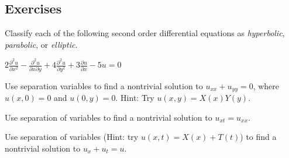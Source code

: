 \subsection{Exercises}

\begin{exercise}
Classify each of the following second order differential equations as \emph{hyperbolic}, \emph{parabolic}, or \emph{elliptic}.
\begin{tasks}
\task $\displaystyle 2 \frac{\partial^2 u}{\partial x^2} - \frac{\partial^2 u}{\partial x \partial y} + 4 \frac{\partial^2 u}{\partial y^2} + 3 \frac{\partial u}{\partial x} - 5u = 0$
\end{tasks}
\end{exercise}

\begin{exercise}
Use separation variables to find a nontrivial
solution to $u_{xx} + u_{yy} = 0$, where $u(x,0) = 0$ and $u(0,y) = 0$.
Hint: Try $u(x,y) = X(x)Y(y)$.
\end{exercise}

\begin{exercise}\ansMark%
Use separation of variables to find a nontrivial solution to
$u_{xt} = u_{xx}$.
\end{exercise}

\begin{exercise}\ansMark%
Use separation of variables (Hint: try $u(x,t) = X(x)+T(t)$)
to find a nontrivial solution to
$u_{x} + u_{t} = u$.
\end{exercise}


